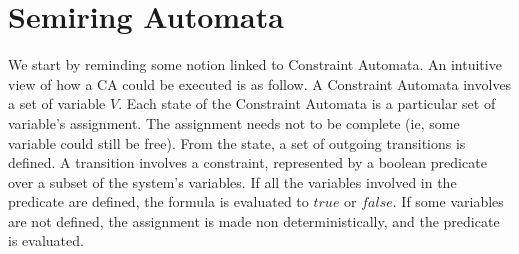 \section{Semiring Automata}
We start by reminding some notion linked to Constraint Automata. An intuitive view of how a CA could be executed is as follow. A Constraint Automata involves a set of variable $V$. Each state of the Constraint Automata is a particular set of variable's assignment. The assignment needs not to be complete (ie, some variable could still be free). From the state, a set of outgoing transitions is defined. A transition involves a constraint, represented by a boolean predicate over a subset of the system's variables. If all the variables involved in the predicate are defined, the formula is evaluated to $true$ or $false$. If some variables are not defined, the assignment is made non deterministically, and the predicate is evaluated.

